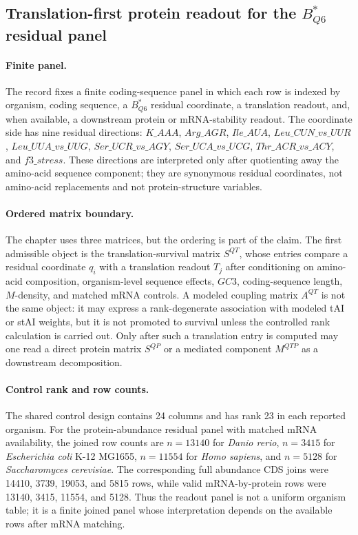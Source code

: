 \subsection{Translation-first protein readout for the $B^{*}_{Q6}$ residual panel}
\label{sec:q6-three-matrix-translation-first-protein-readout-cross-layer}

\paragraph{Finite panel.}
The record fixes a finite coding-sequence panel in which each row is indexed by organism, coding sequence, a $B^{*}_{Q6}$ residual coordinate, a translation readout, and, when available, a downstream protein or mRNA-stability readout. The coordinate side has nine residual directions: $K\_AAA$, $Arg\_AGR$, $Ile\_AUA$, $Leu\_CUN\_vs\_UUR$, $Leu\_UUA\_vs\_UUG$, $Ser\_UCR\_vs\_AGY$, $Ser\_UCA\_vs\_UCG$, $Thr\_ACR\_vs\_ACY$, and $f3\_stress$. These directions are interpreted only after quotienting away the amino-acid sequence component; they are synonymous residual coordinates, not amino-acid replacements and not protein-structure variables.

\paragraph{Ordered matrix boundary.}
The chapter uses three matrices, but the ordering is part of the claim. The first admissible object is the translation-survival matrix $S^{QT}$, whose entries compare a residual coordinate $q_i$ with a translation readout $T_j$ after conditioning on amino-acid composition, organism-level sequence effects, $GC3$, coding-sequence length, $M$-density, and matched mRNA controls. A modeled coupling matrix $A^{QT}$ is not the same object: it may express a rank-degenerate association with modeled tAI or stAI weights, but it is not promoted to survival unless the controlled rank calculation is carried out. Only after such a translation entry is computed may one read a direct protein matrix $S^{QP}$ or a mediated component $M^{QTP}$ as a downstream decomposition.

\paragraph{Control rank and row counts.}
The shared control design contains 24 columns and has rank 23 in each reported organism. For the protein-abundance residual panel with matched mRNA availability, the joined row counts are $n=13140$ for \emph{Danio rerio}, $n=3415$ for \emph{Escherichia coli} K-12 MG1655, $n=11554$ for \emph{Homo sapiens}, and $n=5128$ for \emph{Saccharomyces cerevisiae}. The corresponding full abundance CDS joins were 14410, 3739, 19053, and 5815 rows, while valid mRNA-by-protein rows were 13140, 3415, 11554, and 5128. Thus the readout panel is not a uniform organism table; it is a finite joined panel whose interpretation depends on the available rows after mRNA matching.

